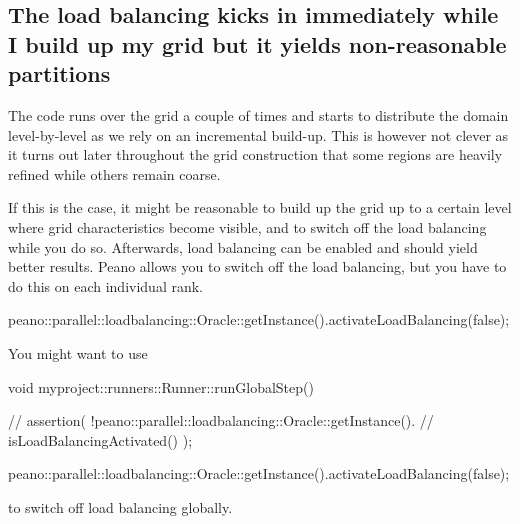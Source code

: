\subsection{The load balancing kicks in immediately while I build up my grid but it
yields non-reasonable partitions}


\begin{smell}
The code runs over the grid a couple of times and starts to distribute the
domain level-by-level as we rely on an incremental build-up. This is however not
clever as it turns out later throughout the grid construction that some regions
are heavily refined while others remain coarse.
\end{smell}


\noindent
If this is the case, it might be reasonable to build up the grid up to a certain
level where grid characteristics become visible, and to switch off the load
balancing while you do so.
Afterwards, load balancing can be enabled and should yield better results. 
Peano allows you to switch off the load balancing, but you have to do this on
each individual rank. 

\begin{code}
peano::parallel::loadbalancing::Oracle::getInstance().activateLoadBalancing(false);
\end{code}


You might want to use
\begin{code}
void myproject::runners::Runner::runGlobalStep() {
  // assertion( !peano::parallel::loadbalancing::Oracle::getInstance().
  // isLoadBalancingActivated() );

  peano::parallel::loadbalancing::Oracle::getInstance().activateLoadBalancing(false);
}
\end{code}

\noindent
to switch off load balancing globally.


